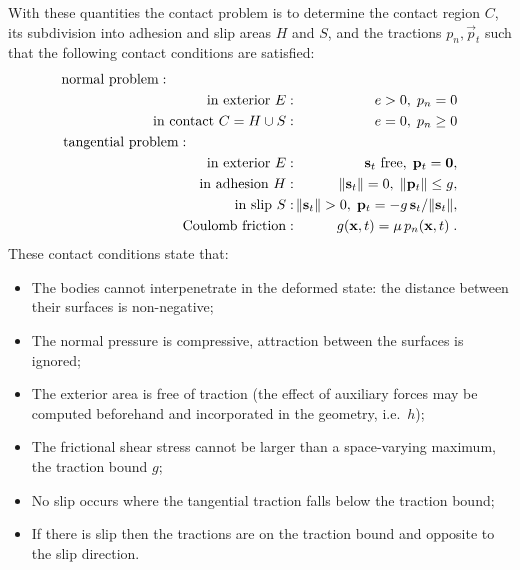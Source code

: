 \documentclass[12pt]{report}
\begin{document}
With these quantities the contact problem is to determine the contact
region $C$, its subdivision into adhesion and slip areas $H$ and $S$, and the
tractions $p_n, \vec{p}_t$ such that the following contact conditions are
satisfied:
\begin{eqnarray}
\mbox{normal problem} : \hspace{32mm} &&     \nonumber\\
  \mbox{in exterior $E$} :      && \hspace{-3mm} e > 0, \; p_n = 0
                                                \label{eq:norm_ext} \\
  \mbox{in contact $C=H\cup S$} : && \hspace{-3mm} e = 0, \; p_n \ge 0
                                                \label{eq:norm_int} \\
\mbox{tangential problem} : \hspace{27mm} && \nonumber\\
  \mbox{in exterior $E$} :      && \hspace{-3mm}
           \vec{s}_t \mbox{ free}, \; \vec{p}_t = \vec{0},
                                                \label{eq:tang_ext} \\
  \mbox{in adhesion $H$} :      && \hspace{-3mm}
           \|\vec{s}_t\| = 0, \; \|\vec{p}_t\| \le g,
                                                \label{eq:tang_adhes} \\
  \mbox{in slip $S$} :          && \hspace{-3mm}
           \|\vec{s}_t\| > 0, \; \vec{p}_t =
                                -g \,\vec{s}_t/\|\vec{s}_t\|,
                                                \label{eq:tang_slip} \\
  \mbox{Coulomb friction} :   && \hspace{-3mm}
     g(\vec{x},t) = \mu \, p_n(\vec{x},t) \; .\label{eq:tract_bound}
\end{eqnarray}
These contact conditions state that:
\begin{itemize}
\item The bodies cannot interpenetrate in the deformed state: the distance
        between their surfaces is non-negative;
\item The normal pressure is compressive, attraction between the surfaces
        is ignored;
\item The exterior area is free of traction (the effect of auxiliary forces
        may be computed beforehand and incorporated in the geometry, i.e.\
        $h$);
\item The frictional shear stress cannot be larger than a space-varying
        maximum, the traction bound $g$;
\item No slip occurs where the tangential traction falls below the traction
        bound;
\item If there is slip then the tractions are on the traction bound and
        opposite to the slip direction.
\end{itemize}
\end{document}
